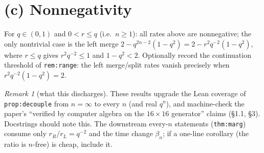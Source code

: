 \documentclass[11pt]{article}
\theoremstyle{plain}
\theoremstyle{remark}
\newtheorem{remark}{Remark}
\begin{document}
\section*{(c) Nonnegativity}

For $q\in(0,1)$ and $0<r\le q$ (i.e.\ $n\ge1$): all rates above are nonnegative;
the only nontrivial case is the left merge $2-q^{2n-2}(1-q^2)=2-r^2q^{-2}(1-q^2)$,
where $r\le q$ gives $r^2q^{-2}\le1$ and $1-q^2<2$. Optionally record the
continuation threshold of \texttt{rem:range}: the left merge/split rates vanish
precisely when $r^2q^{-2}(1-q^2)=2$.

\begin{remark}[what this discharges]
These results upgrade the Lean coverage of \texttt{prop:decouple} from $n=\infty$
to every $n$ (and real $q^n$), and machine-check the paper's ``verified by computer
algebra on the $16\times16$ generator'' claims (\S1.1, \S3). Docstrings should note
this. The downstream every-$n$ statements (\texttt{thm:marg}) consume only
$r_R/r_L=q^{-2}$ and the time change $\beta_n$; if a one-line corollary (the ratio
is $n$-free) is cheap, include it.
\end{remark}
\end{document}
